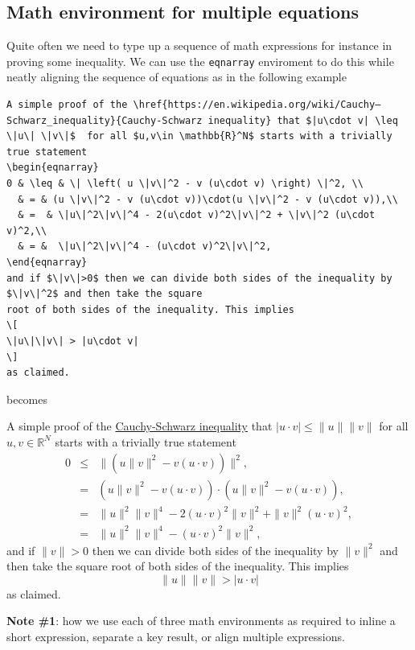 \subsection{Math environment for multiple equations}

Quite often we need to type up a sequence of math expressions for instance in proving some inequality. We can use the \texttt{eqnarray} enviroment to do this while neatly aligning the sequence of equations as in the following example

\begin{verbatim}
A simple proof of the \href{https://en.wikipedia.org/wiki/Cauchy–Schwarz_inequality}{Cauchy-Schwarz inequality} that $|u\cdot v| \leq \|u\| \|v\|$  for all $u,v\in \mathbb{R}^N$ starts with a trivially true statement
\begin{eqnarray}
0 & \leq & \| \left( u \|v\|^2 - v (u\cdot v) \right) \|^2, \\
  & = & (u \|v\|^2 - v (u\cdot v))\cdot(u \|v\|^2 - v (u\cdot v)),\\
  & =  & \|u\|^2\|v\|^4 - 2(u\cdot v)^2\|v\|^2 + \|v\|^2 (u\cdot v)^2,\\
  & = &  \|u\|^2\|v\|^4 - (u\cdot v)^2\|v\|^2,
\end{eqnarray}
and if $\|v\|>0$ then we can divide both sides of the inequality by $\|v\|^2$ and then take the square
root of both sides of the inequality. This implies
\[
\|u\|\|v\| > |u\cdot v|
\]
as claimed.
\end{verbatim}
becomes
\begin{tcolorbox}
A simple proof of the \href{https://en.wikipedia.org/wiki/Cauchy–Schwarz_inequality}{Cauchy-Schwarz inequality} 
that $|u\cdot v| \leq \|u\| \|v\|$  for all $u,v\in \mathbb{R}^N$ 
starts with a trivially true statement
\begin{eqnarray}
0 & \leq & \| \left( u \|v\|^2 - v (u\cdot v) \right) \|^2, \\
  & = & (u \|v\|^2 - v (u\cdot v))\cdot(u \|v\|^2 - v (u\cdot v)),\\
  & =  & \|u\|^2\|v\|^4 - 2(u\cdot v)^2\|v\|^2 + \|v\|^2 (u\cdot v)^2,\\
  & = &  \|u\|^2\|v\|^4 - (u\cdot v)^2\|v\|^2,
\end{eqnarray}
and if $\|v\|>0$ then we can divide both sides of the inequality by $\|v\|^2$ and then take the square 
root of both sides of the inequality. This implies
\[
\|u\|\|v\| > |u\cdot v|
\]
as claimed.
\end{tcolorbox}
{\bf Note \#1}: how we use each of  three math environments as required to inline a short expression, separate a key result, or align multiple expressions. 

